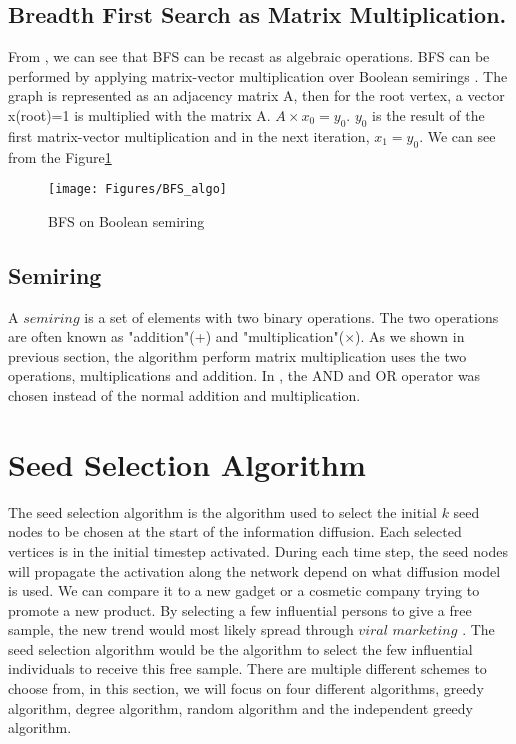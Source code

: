 \subsection{Breadth First Search as Matrix Multiplication.} \label{BFS as Matrix}
From  \cite{AlgoToMath}, we can see that BFS can be recast as algebraic operations. BFS can be performed by applying matrix-vector multiplication over Boolean semirings \cite{HybridBFS2015}. The graph is represented as an adjacency matrix A, then for the root vertex, a vector x(root)=1 is multiplied with the matrix A. $A \times x_0 = y_0$. $y_0$ is the result of the first matrix-vector multiplication and in the next iteration, $x_1 = y_0$. We can see from the Figure\ref{fig:bfsMatrix}

\begin{figure}
    \texttt{[image: Figures/BFS\_algo]}
    \caption{BFS on Boolean semiring}
    \label{fig:bfsMatrix}
\end{figure}
\subsection{Semiring}
A $semiring$ is a set of elements with two binary operations. The two operations are often known as "addition"(+) and "multiplication"($\times$).  As we shown in previous section, the algorithm perform matrix multiplication uses the two operations, multiplications and addition. In  \cite{HybridBFS2015}, the AND and OR operator was chosen instead of the normal addition and multiplication. 

 
 
\section{Seed Selection Algorithm}
The seed selection algorithm is the algorithm used to select the initial $k$ seed nodes to be chosen at the start of the information diffusion. Each selected vertices is in the initial timestep activated. During each time step, the seed nodes will propagate the activation along the network depend on what diffusion model is used. We can compare it to a new gadget or a cosmetic company trying to promote a new product. By selecting a few influential persons to give a free sample, the new trend would most likely spread through $viral$ $marketing$ \cite{ViralMarketing}. The seed selection algorithm would be the algorithm to select the few influential individuals to receive this free sample. There are multiple different schemes to choose from, in this section, we will focus on four different algorithms, greedy algorithm, degree algorithm, random algorithm and the independent greedy algorithm.

